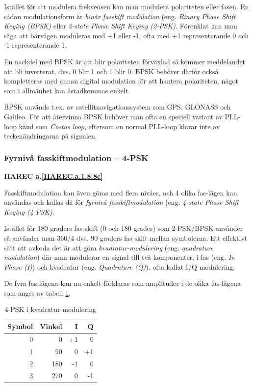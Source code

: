 Istället för att modulera frekvensen kan man modulera polariteten eller fasen.
En sådan modulationsform är \emph{binär fasskift modulation} (eng.
\emph{Binary Phase Shift Keying (BPSK)} eller \emph{2-state Phase Shift Keying
(2-PSK)}. Förenklat kan man säga att bärvågen moduleras med +1 eller -1,
ofta med +1 representerande 0 och -1 representerande 1.

En nackdel med BPSK är att blir polariteten förväxlad så kommer meddelandet
att bli inverterat, dvs. 0 blir 1 och 1 blir 0. BPSK behöver därför också
kompletteras med annan digital modulation för att hantera polariteten, något
som i allmänhet kan åstadkommas enkelt.

BPSK används t.ex. av satellitnavigationssystem som GPS, GLONASS och Galileo.
För att återvinna BPSK behöver man ofta en speciell variant av PLL-loop känd
som \emph{Costas loop}, eftersom en normal PLL-loop klarar inte av
teckenändringarna på signalen.

\subsubsection{Fyrnivå fasskiftmodulation -- 4-PSK}
\textbf{HAREC a.\ref{HAREC.a.1.8.8c}\label{myHAREC.a.1.8.8c}}

Fasskiftmodulation kan även göras med flera nivåer, och 4 olika fas-lägen
kan användas och kallas då för \emph{fyrnivå fasskiftmodulation} (eng.
\emph{4-state Phase Shift Keying (4-PSK)}.

Istället för 180 graders fas-skift (0 och 180 grader) som 2-PSK/BPSK använder
så använder man 360/4 dvs. 90 graders fas-skift mellan symbolerna.
Ett effektivt sätt att avkoda det är att göra \emph{kvadratur-modulering}
(eng. \emph{quadrature modulation}) där man modulerar en signal till två
komponenter, i fas (eng. \emph{In Phase (I)}) och kvadratur (eng.
\emph{Quadrature (Q)}), ofta kallat I/Q modulering.

De fyra fas-lägena kan nu enkelt förklaras som amplituder i de olika fas-lägena
som anges av tabell \ref{tab:4-PSK}.

\begin{table}[h]
\begin{center}
\begin{tabular}{|r|r|r|r|}
\hline
Symbol & Vinkel & I & Q \\ \hline
0 &   0 & +1 &  0 \\
1 &  90 &  0 & +1 \\
2 & 180 & -1 &  0 \\
3 & 270 &  0 & -1 \\ \hline
\end{tabular}
\end{center}
\caption{4-PSK i kvadratur-modulering}
\label{tab:4-PSK}
\end{table}

